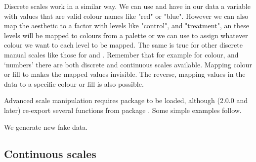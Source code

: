 \documentclass[krantz2]{krantz}\usepackage{knitr}%
\begin{document}
Discrete scales work in a similar way. We can use  and have in our data a variable with values that are valid colour names like "red" or "blue". However we can also map the  aesthetic to a factor with levels like "control", and "treatment", an these levels will be mapped to colours from a palette or we can use  to assign whatever colour we want to each level to be mapped. The same is true for other discrete manual scales like those for   and . Remember that for example for colour, and `numbers' there are both discrete and continuous scales available. Mapping colour or fill to  makes the mapped values invisible. The reverse, mapping  values in the data to a specific colour or fill is also possible.

\sloppy
Advanced scale manipulation requires package  to be loaded, although \ggplot (2.0.0 and later) re-export several functions from package . Some simple examples follow.



We generate new fake data.

\begin{knitrout}\footnotesize
{}\color{fgcolor}\begin{kframe}
\begin{alltt}
 \hlkwb{<-}
  \hlstd{(} \hlstd{=} \hlstd{(}\hlstd{(}\hlstd{,}  \hlstd{=} \hlstd{,}  \hlstd{=} \hlstd{),}
                   \hlstd{(}\hlstd{,}  \hlstd{=} \hlstd{,}  \hlstd{=} \hlstd{)),}
              \hlstd{=} \hlstd{(}\hlstd{(}\hlstd{(}\hlstd{,} \hlstd{),} \hlstd{(}\hlstd{,} \hlstd{))),}
              \hlstd{=} \hlstd{(}\hlstd{,}  \hlstd{=} \hlstd{,}  \hlstd{=} \hlstd{))}
\end{alltt}
\end{kframe}
\end{knitrout}

\subsection{Continuous scales}\label{sec:plot:scales:continuous}
\end{document}
